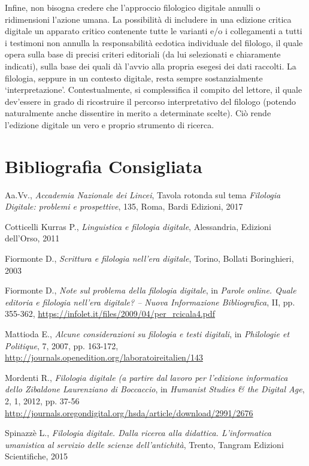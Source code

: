 {Infine, non bisogna credere che l'approccio filologico digitale annulli
o ridimensioni l'azione umana. La possibilità di includere in una
edizione critica digitale un apparato critico contenente tutte le
varianti e/o i collegamenti a tutti i testimoni non annulla la
responsabilità ecdotica individuale del filologo, il quale opera sulla
base di precisi criteri editoriali (da lui selezionati e chiaramente
indicati), sulla base dei quali dà l'avvio alla propria esegesi dei dati
raccolti. La filologia, seppure in un contesto digitale, resta sempre
sostanzialmente `interpretazione'. Contestualmente, si complessifica il
compito del lettore, il quale dev'essere in grado di ricostruire il
percorso interpretativo del filologo (potendo naturalmente anche
dissentire in merito a determinate scelte). Ciò rende l'edizione
digitale un vero e proprio strumento di ricerca.

\section*{Bibliografia Consigliata}
{\parindent0pt 
Aa.Vv., \emph{Accademia Nazionale dei Lincei}, Tavola rotonda sul tema
\emph{Filologia Digitale: problemi e prospettive}, 135, Roma, Bardi
Edizioni, 2017

Cotticelli Kurras P., \emph{Linguistica e filologia digitale},
Alessandria, Edizioni dell'Orso, 2011

Fiormonte D., \emph{Scrittura e filologia nell'era digitale}, Torino,
Bollati Boringhieri, 2003

Fiormonte D., \emph{Note sul problema della filologia digitale}, in
\emph{Parole online. Quale editoria e filologia nell'era digitale? --
Nuova Informazione Bibliografica}, II, pp. 355-362,
\url{https://infolet.it/files/2009/04/per_rcicala4.pdf}

Mattioda E., \emph{Alcune considerazioni su filologia e testi digitali},
in \emph{Philologie et Politique}, 7, 2007, pp. 163-172,
\url{http://journals.openedition.org/laboratoireitalien/143}

Mordenti R., \emph{Filologia digitale (a partire dal lavoro per
l'edizione informatica dello Zibaldone Laurenziano di Boccaccio}, in
\emph{Humanist Studies \& the Digital Age}, 2, 1, 2012, pp. 37-56
\url{http://journals.oregondigital.org/hsda/article/download/2991/2676}


Spinazzè L., \emph{Filologia digitale. Dalla ricerca alla didattica.
L'informatica umanistica al servizio delle scienze dell'antichità},
Trento, Tangram Edizioni Scientifiche, 2015
}

}
